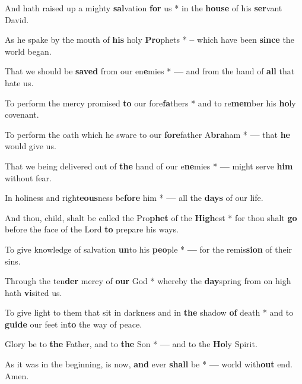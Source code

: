 \begin{multicols}{2}
	And hath raised up a mighty \textbf{sal}vation \textbf{for} us * in the \textbf{house} of his \textbf{ser}vant David.
	
	As he spake by the mouth of \textbf{his} holy \textbf{Pro}phets * \textbf{--} which have been \textbf{since} the world began.
	
	That we should be \textbf{saved} from our en\textbf{e}mies * \textbf{---} and from the hand of \textbf{all} that hate us.
	
	To perform the mercy promised \textbf{to} our fore\textbf{fa}thers * and to re\textbf{mem}ber his \textbf{ho}ly covenant.
	
	To perform the oath which he sware to our \textbf{fore}father A\textbf{bra}ham * \textbf{---} that \textbf{he} would give us.
	
	That we being delivered out of \textbf{the} hand of our e\textbf{ne}mies * \textbf{---} might serve \textbf{him} without fear.
	
	In holiness and right\textbf{eous}ness be\textbf{fore} him * \textbf{---} all the \textbf{days} of our life.
	
	And thou, child, shalt be called the Pro\textbf{phet} of the \textbf{High}est * for thou shalt \textbf{go} before the face of the Lord \textbf{to} prepare his ways.
	
	To give knowledge of salvation \textbf{un}to his \textbf{peo}ple * \textbf{---} for the remis\textbf{sion} of their sins.
	
	Through the ten\textbf{der} mercy of \textbf{our} God * whereby the \textbf{day}spring from on high hath \textbf{vi}sited us.
	
	To give light to them that sit in darkness and in \textbf{the} shadow \textbf{of} death * and to \textbf{guide} our feet in\textbf{to} the way of peace.
	
	Glory be to \textbf{the} Father, and to \textbf{the} Son * \textbf{---} and to the \textbf{Ho}ly Spirit.
	
	As it was in the beginning, is now, \textbf{and} ever \textbf{shall} be * \textbf{---} world with\textbf{out} end. Amen.
\end{multicols}